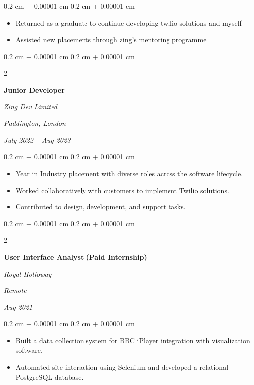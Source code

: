 \documentclass[10pt, letterpaper]{article}
\newenvironment{highlights}{
    \begin{itemize}[
        topsep=0.10 cm,
        parsep=0.10 cm,
        partopsep=0pt,
        itemsep=0pt,
        leftmargin=0.4 cm + 10pt
    ]
}{
    \end{itemize}
} %
\newenvironment{onecolentry}{
    \begin{adjustwidth}{
        0.2 cm + 0.00001 cm
    }{
        0.2 cm + 0.00001 cm
    }
}{
    \end{adjustwidth}
} %
\newenvironment{twocolentry}[2][]{
    \onecolentry
    \def\secondColumn{#2}
    \setcolumnwidth{\fill, 4.5 cm}
    \begin{paracol}{2}
}{
    \switchcolumn \raggedleft \secondColumn
    \end{paracol}
    \endonecolentry
} %
\begin{document}
        \vspace{0.10 cm}
        \begin{onecolentry}
            \begin{highlights}
                \item Returned as a graduate to continue developing twilio solutions and myself
                \item Assisted new placements through zing's mentoring programme
            \end{highlights}
        \end{onecolentry}


        \vspace{0.2 cm}

        \begin{twocolentry}{
        \textit{Paddington, London}    
            
        \textit{July 2022 – Aug 2023}}
            \textbf{Junior Developer}
            
            \textit{Zing Dev Limited}
        \end{twocolentry}

        \vspace{0.10 cm}
        \begin{onecolentry}
            \begin{highlights}
                \item Year in Industry placement with diverse roles across the software lifecycle.
                \item Worked collaboratively with customers to implement Twilio solutions.
                \item Contributed to design, development, and support tasks.
            \end{highlights}
        \end{onecolentry}


        \vspace{0.2 cm}

        \begin{twocolentry}{
        \textit{Remote}    
            
        \textit{Aug 2021}}
            \textbf{User Interface Analyst (Paid Internship)}
            
            \textit{Royal Holloway}
        \end{twocolentry}

        \vspace{0.10 cm}
        \begin{onecolentry}
            \begin{highlights}
                \item Built a data collection system for BBC iPlayer integration with visualization software.
                \item Automated site interaction using Selenium and developed a relational PostgreSQL database.
            \end{highlights}
        \end{onecolentry}
\end{document}
